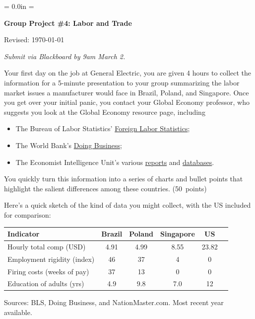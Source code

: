 \documentclass[letterpaper,12pt]{exam}
\def\HeadName{Group Project \#4}
\begin{document}
\parindent = 0.0in
\parskip = \bigskipamount
\thispagestyle{empty}%
\Head

\centerline{\large \bf \HeadName:  Labor and Trade}%
\centerline{Revised:  \today}

\medskip
{\it Submit via Blackboard by 9am March 2.}

\begin{questions}

Your first day on the job at General Electric, 
you are given 4 hours to collect the information for 
a 5-minute presentation to your group summarizing the 
labor market issues a manufacturer would face in 
Brazil, Poland, and Singapore.    
Once you get over your initial panic, 
you contact your Global Economy professor, who suggests you look at
the Global Economy resource page, including     
%
\begin{itemize}

\item The Bureau of Labor Statistics'
\href{http://www.bls.gov/fls/hcaesupptabtoc.htm}
{Foreign Labor Statistics};


\item The World Bank's
\href{http://www.doingbusiness.org/}
{Doing Business};   

\item The Economist Intelligence Unit's various 
\href{http://db.eiu.com/topic_view.asp?pubcode=CP&title=Country+Profile}{reports} 
and 
\href{http://www.countrydata.bvdep.com/cgi/template.dll?product=101&user=ipaddress}
{databases}.  

\end{itemize}
%
You quickly turn this information into a series of charts 
and bullet points 
that highlight the salient differences among these countries.  (50~points) 

\begin{solution}
Here's a quick sketch of the kind of data you
might collect, with the US included for comparison: 
% 
\begin{center}
\begin{tabular}{lccccc}
\hline\hline
Indicator   & Brazil & Poland & Singapore  &  US \\
\hline\hline 
Hourly total comp (USD) & 4.91 & 4.99   & 8.55  &  23.82  \\
Employment rigidity (index)    & 46   & 37   &  4  &  0  \\
Firing costs (weeks of pay) &  37   &  13   &  0  & 0  \\
Education of adults (yrs) &  4.9  &  9.8  & 7.0  &  12 \\
\hline\hline 
\end{tabular}
\end{center}
Sources:  BLS, Doing Business, and NationMaster.com.  
Most recent year available.   


\end{solution}
\end{questions}
\end{document}

